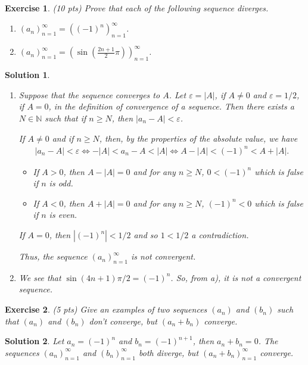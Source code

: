 \documentclass[12pt]{article}
\newcommand{\bN}{\mathbb{N}}
\theoremstyle{plain}
\newtheorem{exer}{\textbf{Exercise}}}
\theoremstyle{plain}
\newtheorem*{sol}{\textbf{Solution}}}
\theoremstyle{plain}
\theoremstyle{plain}
\begin{document}
\begin{exer}
(10 pts)
Prove that each of the following sequence diverges.
	\begin{enumerate}[label=\textbf{\alph*)}]
	\item $(a_n)_{n = 1}^\infty = ( (-1)^n )_{n = 1}^\infty$.
	\item $(a_n)_{n = 1}^\infty = ( \sin (\frac{2n + 1}{2} \pi) )_{n = 1}^{\infty}$.
	\end{enumerate}
\end{exer}
\begin{sol}
\begin{enumerate}[label=\textbf{\alph*)}]
\item Suppose that the sequence converges to $A$. Let $\varepsilon = |A|$, if $A \neq 0$ and $\varepsilon = 1/2$, if $A = 0$, in the definition of convergence of a sequence. Then there exists a $N \in \bN$ such that if $n \geq N$, then $|a_n - A| < \varepsilon$. 

If $A \neq 0$ and if $n \geq N$, then, by the properties of the absolute value, we have
	\begin{align*}
	|a_n - A| < \varepsilon \iff -|A| < a_n - A < |A| \iff A - |A| < (-1)^n < A + |A| .
	\end{align*}
	\begin{itemize}
	\item If $A > 0$, then $A - |A| = 0$ and for any $n \geq N$, $0 < (-1)^n$ which is false if $n$ is odd.
	\item If $A < 0$, then $A + |A| = 0$ and for any $n \geq N$, $(-1)^n < 0$ which is false if $n$ is even.
	\end{itemize}
	
	If $A = 0$, then $|(-1)^n| < 1/2$ and so $1 < 1/2$ a contradiction.
	
Thus, the sequence $(a_n)_{n = 1}^\infty$ is not convergent.
\item We see that $\sin (4n + 1)\pi/2 = (-1)^n$. So, from a), it is not a convergent sequence.
\end{enumerate}
\end{sol}


\begin{exer}
(5 pts)
Give an examples of two sequences $(a_n)$ and $(b_n)$ such that $(a_n)$ and $(b_n)$ don't converge, but $(a_n + b_n)$ converge.
\end{exer}
\begin{sol}
Let $a_n = (-1)^n$ and $b_n = (-1)^{n + 1}$, then $a_n + b_n = 0$. The sequences $(a_n)_{n = 1}^\infty$ and $(b_n)_{n = 1}^\infty$ both diverge, but $(a_n + b_n)_{n = 1}^\infty$ converge.
\end{sol}
\end{document}

